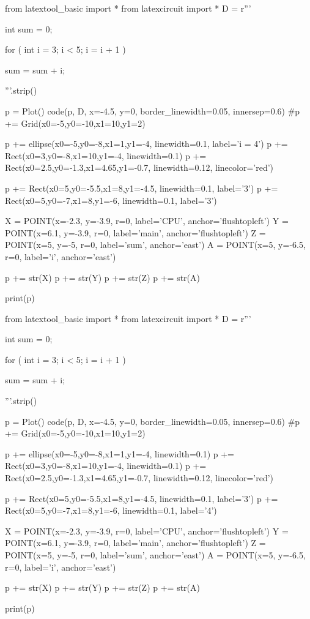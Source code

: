 \begin{python}
from latextool_basic import *
from latexcircuit import *
D = r'''



int sum = 0;

    for ( int i = 3;     i < 5;     i = i + 1 )


        sum = sum + i;



'''.strip()

p = Plot()
code(p, D, x=-4.5, y=0, border_linewidth=0.05, innersep=0.6)
#p += Grid(x0=-5,y0=-10,x1=10,y1=2)

p += ellipse(x0=-5,y0=-8,x1=1,y1=-4, linewidth=0.1, label='i = 4')
p += Rect(x0=3,y0=-8,x1=10,y1=-4, linewidth=0.1)
p += Rect(x0=2.5,y0=-1.3,x1=4.65,y1=-0.7, linewidth=0.12, linecolor='red')

p += Rect(x0=5,y0=-5.5,x1=8,y1=-4.5, linewidth=0.1, label='3')
p += Rect(x0=5,y0=-7,x1=8,y1=-6, linewidth=0.1, label='3')

X = POINT(x=-2.3, y=-3.9, r=0, label='CPU', anchor='flushtopleft')
Y = POINT(x=6.1, y=-3.9, r=0, label='main', anchor='flushtopleft')
Z = POINT(x=5, y=-5, r=0, label='sum', anchor='east')
A = POINT(x=5, y=-6.5, r=0, label='i', anchor='east')

p += str(X)
p += str(Y)
p += str(Z)
p += str(A)

print(p)
\end{python}

\begin{python}
from latextool_basic import *
from latexcircuit import *
D = r'''



int sum = 0;

    for ( int i = 3;     i < 5;     i = i + 1 )


        sum = sum + i;



'''.strip()

p = Plot()
code(p, D, x=-4.5, y=0, border_linewidth=0.05, innersep=0.6)
#p += Grid(x0=-5,y0=-10,x1=10,y1=2)

p += ellipse(x0=-5,y0=-8,x1=1,y1=-4, linewidth=0.1)
p += Rect(x0=3,y0=-8,x1=10,y1=-4, linewidth=0.1)
p += Rect(x0=2.5,y0=-1.3,x1=4.65,y1=-0.7, linewidth=0.12, linecolor='red')

p += Rect(x0=5,y0=-5.5,x1=8,y1=-4.5, linewidth=0.1, label='3')
p += Rect(x0=5,y0=-7,x1=8,y1=-6, linewidth=0.1, label='4')

X = POINT(x=-2.3, y=-3.9, r=0, label='CPU', anchor='flushtopleft')
Y = POINT(x=6.1, y=-3.9, r=0, label='main', anchor='flushtopleft')
Z = POINT(x=5, y=-5, r=0, label='sum', anchor='east')
A = POINT(x=5, y=-6.5, r=0, label='i', anchor='east')

p += str(X)
p += str(Y)
p += str(Z)
p += str(A)

print(p)
\end{python}

